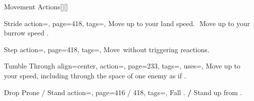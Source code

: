 \begin{PageBack}
\begin{Tables}{\backTableHeight}
        \TableSpace
        \begin{Table}{Movement Actions}[][]
            \begin{entry}{Stride}{%
                action=,
                page=418,
                tags=\Move,
            }
                Move up to your land speed.\hfill {}\;\,\Move\, Move up to your burrow
                speed .
            \end{entry}
            \begin{entry}{Step}{%
                action=,
                page=418,
                tags=\Move,
            }
                Move \,\Feet without triggering reactions.
            \end{entry}
            \begin{entry}{Tumble Through}{%
                align=center,
                action=,
                page=233,
                tags=\Move,
                uses=\AcrobaticsReflex,
            }
                Move up to your speed, including through the space of one enemy as if .\\\phant
            \end{entry}
            \breakLine
            \begin{entry}{Drop Prone / Stand}{%
                action=,
                page=416 / 418,
                tags=\Move,
            }
                Fall \Prone. \textbf{/} Stand up from \Prone.
            \end{entry}

\end{Table}
\end{Tables}
\end{PageBack}
